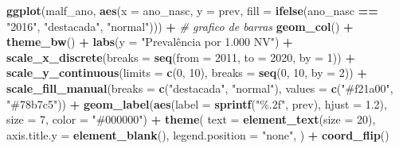 \documentclass[
]{article}
\newenvironment{Shaded}{\begin{snugshade}}{\end{snugshade}}
\newcommand{\AttributeTok}[1]{\textcolor[rgb]{0.13,0.29,0.53}{#1}}
\newcommand{\CommentTok}[1]{\textcolor[rgb]{0.56,0.35,0.01}{\textit{#1}}}
\newcommand{\DecValTok}[1]{\textcolor[rgb]{0.00,0.00,0.81}{#1}}
\newcommand{\FloatTok}[1]{\textcolor[rgb]{0.00,0.00,0.81}{#1}}
\newcommand{\FunctionTok}[1]{\textcolor[rgb]{0.13,0.29,0.53}{\textbf{#1}}}
\newcommand{\NormalTok}[1]{#1}
\newcommand{\SpecialCharTok}[1]{\textcolor[rgb]{0.81,0.36,0.00}{\textbf{#1}}}
\newcommand{\StringTok}[1]{\textcolor[rgb]{0.31,0.60,0.02}{#1}}
\begin{document}
\begin{Shaded}
\begin{Highlighting}[]
\FunctionTok{ggplot}\NormalTok{(malf\_ano, }\FunctionTok{aes}\NormalTok{(}\AttributeTok{x =}\NormalTok{ ano\_nasc, }\AttributeTok{y =}\NormalTok{ prev, }
                     \AttributeTok{fill =} \FunctionTok{ifelse}\NormalTok{(ano\_nasc }\SpecialCharTok{==} \StringTok{"2016"}\NormalTok{, }\StringTok{"destacada"}\NormalTok{, }\StringTok{"normal"}\NormalTok{))) }\SpecialCharTok{+} 
  \CommentTok{\# grafico de barras}
  \FunctionTok{geom\_col}\NormalTok{() }\SpecialCharTok{+} 
  \FunctionTok{theme\_bw}\NormalTok{() }\SpecialCharTok{+} 
  \FunctionTok{labs}\NormalTok{(}\AttributeTok{y =} \StringTok{"Prevalência por 1.000 NV"}\NormalTok{) }\SpecialCharTok{+} 
  \FunctionTok{scale\_x\_discrete}\NormalTok{(}\AttributeTok{breaks =} \FunctionTok{seq}\NormalTok{(}\AttributeTok{from =} \DecValTok{2011}\NormalTok{, }\AttributeTok{to =} \DecValTok{2020}\NormalTok{, }\AttributeTok{by =} \DecValTok{1}\NormalTok{)) }\SpecialCharTok{+}
  \FunctionTok{scale\_y\_continuous}\NormalTok{(}\AttributeTok{limits =} \FunctionTok{c}\NormalTok{(}\DecValTok{0}\NormalTok{, }\DecValTok{10}\NormalTok{), }\AttributeTok{breaks =} \FunctionTok{seq}\NormalTok{(}\DecValTok{0}\NormalTok{, }\DecValTok{10}\NormalTok{, }\AttributeTok{by =} \DecValTok{2}\NormalTok{)) }\SpecialCharTok{+}
  \FunctionTok{scale\_fill\_manual}\NormalTok{(}\AttributeTok{breaks =} \FunctionTok{c}\NormalTok{(}\StringTok{"destacada"}\NormalTok{, }\StringTok{"normal"}\NormalTok{), }\AttributeTok{values =} \FunctionTok{c}\NormalTok{(}\StringTok{"\#f21a00"}\NormalTok{, }\StringTok{"\#78b7c5"}\NormalTok{)) }\SpecialCharTok{+}
  \FunctionTok{geom\_label}\NormalTok{(}\FunctionTok{aes}\NormalTok{(}\AttributeTok{label =} \FunctionTok{sprintf}\NormalTok{(}\StringTok{"\%.2f"}\NormalTok{, prev), }\AttributeTok{hjust =} \FloatTok{1.2}\NormalTok{), }\AttributeTok{size =} \DecValTok{7}\NormalTok{, }\AttributeTok{color =} \StringTok{"\#000000"}\NormalTok{) }\SpecialCharTok{+}
  \FunctionTok{theme}\NormalTok{(}
    \AttributeTok{text =} \FunctionTok{element\_text}\NormalTok{(}\AttributeTok{size =} \DecValTok{20}\NormalTok{),}
    \AttributeTok{axis.title.y =} \FunctionTok{element\_blank}\NormalTok{(),}
    \AttributeTok{legend.position =} \StringTok{"none"}\NormalTok{, }
\NormalTok{  ) }\SpecialCharTok{+}
  \FunctionTok{coord\_flip}\NormalTok{()}
\end{Highlighting}
\end{Shaded}
\end{document}
